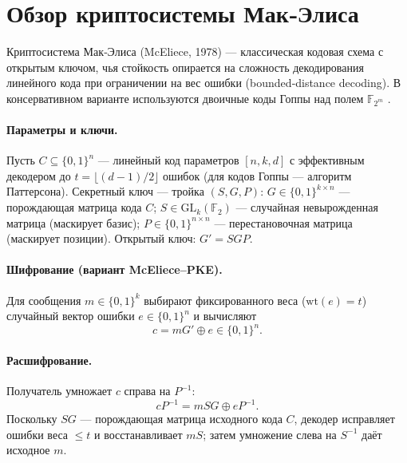
\section{Обзор криптосистемы Мак‑Элиса}

Криптосистема Мак‑Элиса (McEliece, 1978) — классическая кодовая схема с открытым ключом, чья стойкость опирается на сложность декодирования линейного кода при ограничении на вес ошибки (bounded‑distance decoding). В консервативном варианте используются двоичные коды Гоппы над полем \(\mathbb{F}_{2^m}\) \cite{ClassicMcEliece2020}.

\paragraph{Параметры и ключи.}
Пусть \(C\subseteq\{0,1\}^n\) — линейный код параметров \([n,k,d]\) с эффективным декодером до \(t=\lfloor(d-1)/2\rfloor\) ошибок (для кодов Гоппы — алгоритм Паттерсона).
Секретный ключ — тройка \((S,G,P)\): \(G\in\{0,1\}^{k\times n}\) — порождающая матрица кода \(C\); \(S\in \mathrm{GL}_k(\mathbb{F}_2)\) — случайная невырожденная матрица (маскирует базис); \(P\in\{0,1\}^{n\times n}\) — перестановочная матрица (маскирует позиции). Открытый ключ: \(G' = SGP\).

\paragraph{Шифрование (вариант McEliece–PKE).}
Для сообщения \(m\in\{0,1\}^k\) выбирают фиксированного веса (\(\mathrm{wt}(e)=t\)) случайный вектор ошибки \(e\in\{0,1\}^n\) и вычисляют
\[
  c = mG' \oplus e \in \{0,1\}^n .
\]

\paragraph{Расшифрование.}
Получатель умножает \(c\) справа на \(P^{-1}\):
\[
  cP^{-1} = mSG \oplus eP^{-1}.
\]
Поскольку \(SG\) — порождающая матрица исходного кода \(C\), декодер исправляет ошибки веса \(\le t\) и восстанавливает \(mS\); затем умножение слева на \(S^{-1}\) даёт исходное \(m\).

